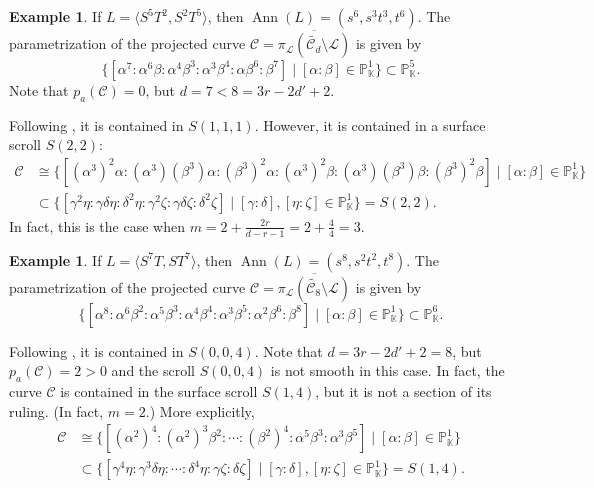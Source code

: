 \documentclass[a4paper, 11pt]{amsart}
\numberwithin{theorem}{section}
\theoremstyle{definition}
\newtheorem{example}[theorem]{Example}
\numberwithin{equation}{section}
\DeclareMathOperator{\Ann}{\operatorname{Ann}}
\begin{document}
\begin{example}\label{ex:surface-exception}
If $L= \langle S^5T^2, S^2T^5 \rangle$, then $\Ann(L)=(s^6,s^3t^3,t^6)$. 
The parametrization of the projected curve $\mathcal{C} = \overline{\pi_{\mathcal{L}}(\widetilde{\mathcal{C}_d}\setminus \mathcal{L})}$ is given by
\[
\{ [\alpha^7:\alpha^6\beta:\alpha^4\beta^3:\alpha^3\beta^4:\alpha \beta^6:\beta^7] \mid [\alpha:\beta] \in \mathbb{P}_{\mathbb{K}}^1 \} \subset\mathbb{P}_{\mathbb{K}}^5.
\]
Note that $p_a(\mathcal{C}) = 0$, but $d = 7 < 8 = 3r-2d'+2$.

Following , it is contained in $S(1,1,1)$.
However, it is contained in a surface scroll $S(2,2)$:
{\small
\begin{align*}
     \mathcal{C} &\cong \{[(\alpha^3)^2\alpha:(\alpha^3)(\beta^3)\alpha:(\beta^3)^2\alpha:(\alpha^3)^2\beta:(\alpha^3)(\beta^3)\beta:(\beta^3)^2\beta] \mid [\alpha:\beta] \in \mathbb{P}_{\mathbb{K}}^1\} \\
     & \subset  \{ [\gamma^2\eta:\gamma\delta \eta:\delta^2\eta:\gamma^2\zeta:\gamma\delta \zeta:\delta^2\zeta] \mid [\gamma:\delta],[\eta:\zeta] \in \mathbb{P}_{\mathbb{K}}^1\} = S(2,2).
\end{align*}
}
In fact, this is the case when $m=2+\frac{2r}{d-r-1}=2+\frac{4}{4}=3$. 
\end{example}
\begin{example}
If $L = \langle S^7T, ST^7\rangle$, then $\Ann(L)=(s^8, s^2t^2, t^8)$.
The parametrization of the projected curve $\mathcal{C} = \overline{\pi_{\mathcal{L}}(\widetilde{\mathcal{C}_8}\setminus \mathcal{L})}$ is given by
\[
\{ [\alpha^8:\alpha^6\beta^2:\alpha^5\beta^3:\alpha^4\beta^4:\alpha^3\beta^5:\alpha^2\beta^6:\beta^8] \mid [\alpha:\beta] \in \mathbb{P}_{\mathbb{K}}^1 \} \subset\mathbb{P}_{\mathbb{K}}^6.
\]

Following , it is contained in $S(0,0,4)$.
Note that $d = 3r-2d'+2 =8$, but $p_a(\mathcal{C}) = 2 >0$ and the scroll $S(0,0,4)$ is not smooth in this case.
In fact, the curve $\mathcal{C}$ is contained in the surface scroll $S(1,4)$, but it is not a section of its ruling. (In fact, $m=2$.)
More explicitly,
\begin{align*}
\mathcal{C} &\cong \bigl\{[(\alpha^2)^4:(\alpha^2)^3\beta^2:\cdots:(\beta^2)^4: \alpha^5\beta^3:\alpha^3\beta^5] \mid [\alpha:\beta]\in\mathbb P_{\mathbb K}^1 \bigr\} \\
&\subset \bigl\{[\gamma^4\eta:\gamma^3\delta\eta:\cdots:\delta^4\eta:\gamma\zeta:\delta\zeta]\mid [\gamma:\delta], [\eta:\zeta]\in\mathbb P_{\mathbb K}^1 \bigr\} = S(1,4).
\end{align*}
\end{example}
\end{document}
